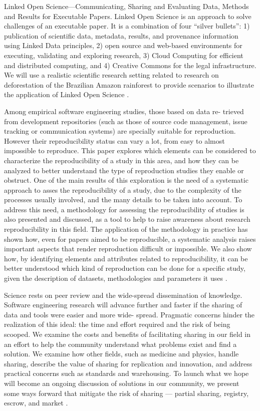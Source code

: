 Linked Open Science—Communicating, Sharing and Evaluating
Data, Methods and Results for Executable Papers.
Linked Open Science is an approach to solve challenges of an executable paper. It is a combination of four “silver
bullets”: 1) publication of scientific data, metadata, results, and provenance information using Linked Data principles,
2) open source and web-based environments for executing, validating and exploring research, 3) Cloud Computing
for efficient and distributed computing, and 4) Creative Commons for the legal infrastructure. We will use a realistic
scientific research setting related to research on deforestation of the Brazilian Amazon rainforest to provide scenarios
to illustrate the application of Linked Open Science \cite{Kauppinen2011}.

Among empirical software engineering studies, those based on data re-
trieved from development repositories (such as those of source code management,
issue tracking or communication systems) are specially suitable for reproduction.
However their reproducibility status can vary a lot, from easy to almost impossible
to reproduce. This paper explores which elements can be considered to characterize
the reproducibility of a study in this area, and how they can be analyzed to better
understand the type of reproduction studies they enable or obstruct. One of the
main results of this exploration is the need of a systematic approach to asses the
reproducibility of a study, due to the complexity of the processes usually involved,
and the many details to be taken into account. To address this need, a methodology
for assessing the reproducibility of studies is also presented and discussed, as a tool to
help to raise awareness about research reproducibility in this field. The application
of the methodology in practice has shown how, even for papers aimed to be
reproducible, a systematic analysis raises important aspects that render reproduction
difficult or impossible. We also show how, by identifying elements and attributes
related to reproducibility, it can be better understood which kind of reproduction
can be done for a specific study, given the description of datasets, methodologies and
parameters it uses \cite{gonzalez2012reproducibility}.


Science rests on peer review and the wide-spread dissemination of
knowledge. Software engineering research will advance further and
faster if the sharing of data and tools were easier and more wide-
spread. Pragmatic concerns hinder the realization of this ideal: the
time and effort required and the risk of being scooped. We examine
the costs and benefits of facilitating sharing in our field in an effort
to help the community understand what problems exist and find
a solution. We examine how other fields, such as medicine and
physics, handle sharing, describe the value of sharing for replication
and innovation, and address practical concerns such as standards
and warehousing. To launch what we hope will become an ongoing
discussion of solutions in our community, we present some ways
forward that mitigate the risk of sharing — partial sharing, registry,
escrow, and market \cite{barr2010shoulders}.

